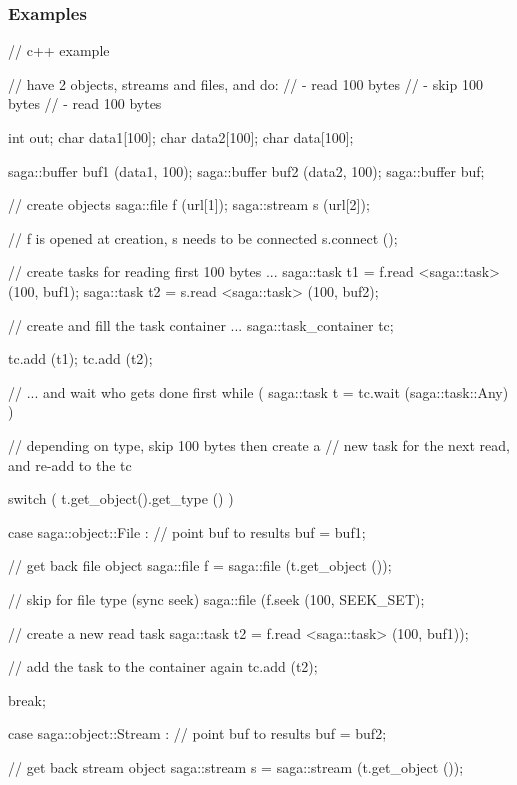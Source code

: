  
 \subsubsection{Examples}
 
 \begin{mycode}
  // c++ example
 
  // have 2 objects, streams and files, and do:
  //  - read 100 bytes
  //  - skip 100 bytes
  //  - read 100 bytes
 
  int  out;
  char data1[100];
  char data2[100];
  char data[100];
 
  saga::buffer buf1 (data1, 100);
  saga::buffer buf2 (data2, 100);
  saga::buffer buf;
 
  // create objects
  saga::file   f (url[1]);
  saga::stream s (url[2]);
 
  // f is opened at creation, s needs to be connected
  s.connect ();
 
  // create tasks for reading first 100 bytes ...
  saga::task t1 = f.read <saga::task> (100, buf1);
  saga::task t2 = s.read <saga::task> (100, buf2);
 
  // create and fill the task container ...
  saga::task_container tc;
 
  tc.add (t1);
  tc.add (t2);
 
  // ... and wait who gets done first
  while ( saga::task t = tc.wait (saga::task::Any) )
  {
     // depending on type, skip 100 bytes then create a
     // new task for the next read, and re-add to the tc
 
     switch ( t.get_object().get_type () )
     {
       case saga::object::File :
         // point buf to results
         buf = buf1;
 
         // get back file object
         saga::file f = saga::file (t.get_object ());
 
         // skip for file type (sync seek)
         saga::file (f.seek (100, SEEK_SET);
 
         // create a new read task
         saga::task t2 = f.read <saga::task> (100, buf1));
 
         // add the task to the container again
         tc.add (t2);
 
         break;
 
       case saga::object::Stream :
         // point buf to results
         buf = buf2;
 
         // get back stream object
         saga::stream s = saga::stream (t.get_object ());
 
}}
\end{mycode}
